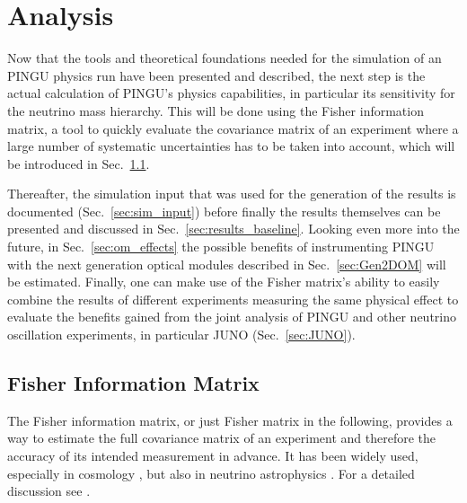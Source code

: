 \chapter{Analysis}
\label{sec:ana}

Now that the tools and theoretical foundations needed for the simulation of an
PINGU physics run have been presented and described, the next step is the
actual calculation of PINGU's physics capabilities, in particular its
sensitivity for the neutrino mass hierarchy. This will be done using the Fisher
information matrix, a tool to quickly evaluate the covariance matrix of an
experiment where a large number of systematic uncertainties has to be taken
into account, which will be introduced in Sec.~\ref{sec:fisher}.

Thereafter, the simulation input that was used for the generation of the
results is documented (Sec.~\ref{sec:sim_input}) before finally the results
themselves can be presented and discussed in Sec.~\ref{sec:results_baseline}.
Looking even more into the future, in Sec.~\ref{sec:om_effects} 
the possible benefits of instrumenting PINGU with the next generation optical
modules described in Sec.~\ref{sec:Gen2DOM} will be estimated. Finally, one can
make use of the
Fisher matrix's ability to easily combine the results of different experiments
measuring the same physical effect to evaluate the benefits gained from the
joint analysis of PINGU and other neutrino oscillation experiments, in
particular JUNO \cite{JUNO} (Sec.~\ref{sec:JUNO}).


\section{Fisher Information Matrix}
\label{sec:fisher}

The Fisher information matrix, or just Fisher matrix in the following, provides
a way to estimate the full covariance matrix of an experiment and therefore the
accuracy of its intended measurement in advance. It has been widely used,
especially in cosmology \cite{Fisher_first}, but also in neutrino
astrophysics \cite{MarekDiffuse}. For a detailed discussion see \eg
\cite{Fisher_first, DETF, DETF2}.

